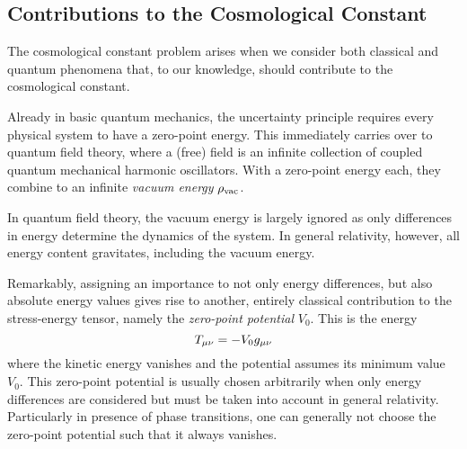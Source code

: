 \documentclass[12pt,parskip=half]{scrreprt}
\begin{document}
\subsection{Contributions to the Cosmological Constant}\label{sec:cc_contrib}

The cosmological constant problem arises when we consider both classical and quantum phenomena that, to our knowledge, should contribute to the cosmological constant.

Already in basic quantum mechanics, the uncertainty principle requires every physical system to have a zero-point energy. This immediately carries over to quantum field theory, where a (free) field is an infinite collection of coupled quantum mechanical harmonic oscillators. With a zero-point energy each, they combine to an infinite \emph{vacuum energy} \(\rho_\textnormal{vac}\). 
 
In quantum field theory, the vacuum energy is largely ignored as only differences in energy determine the dynamics of the system. In general relativity, however, all energy content gravitates, including the vacuum energy.  

Remarkably, assigning an importance to not only energy differences, but also absolute energy values gives rise to another, entirely classical contribution to the stress-energy tensor, namely the \emph{zero-point potential} \(V_0\). This is the energy
\begin{equation}
	T_{\mu\nu} = - V_0 g_{\mu\nu}
\end{equation}
where the kinetic energy vanishes and the potential assumes its minimum value \(V_0\). This zero-point potential is usually chosen arbitrarily when only energy differences are considered but must be taken into account in general relativity. Particularly in presence of phase transitions, one can generally not choose the zero-point potential such that it always vanishes.
\end{document}
